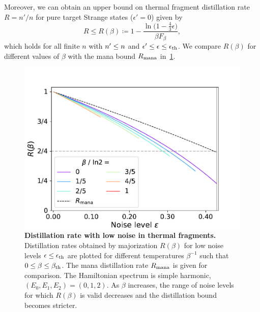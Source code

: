 \documentclass[pra,
aps,
twocolumn,
superscriptaddress,
groupedaddress,
nofootinbib,
reprint
]{revtex4-1}
\begin{document}
Moreover, we can obtain an upper bound on thermal fragment distillation rate $R=n'/n$ for pure target Strange states ($\epsilon' = 0$) given by
\begin{equation}
	R \leq R(\beta) \coloneqq 1 - \frac{\ln{\big( 1-\frac{4}{3}\epsilon \big)}}{\beta F_\beta},
\end{equation}
which holds for all finite $n$ with $\tt \leq n$ and $\epsilon' \leq \epsilon \leq \epsilon_{\rm{th}}$. 
We compare $R(\beta)$ for different values of $\beta$ with the mana bound $R_{\rm{mana}}$ in~\cref{fig:distill_bounds_temp}.
\begin{figure}[h]
    \centering
    \includegraphics[scale=0.5]{figs/distill_bounds_temp.pdf}
    \caption{\textbf{Distillation rate with low noise in thermal fragments.} Distillation rates obtained by majorization $R(\beta)$ for low noise levels $\epsilon \leq \epsilon_{\rm{th}}$ are plotted for different temperatures $\beta^{-1}$ such that $0 \leq \beta \leq \beta_{\rm{th}}$.
    The mana distillation rate $R_{\rm{mana}}$ is given for comparison.
    The Hamiltonian spectrum is simple harmonic, $(E_0, E_1, E_2) = (0,1,2)$.
    As $\beta$ increases, the range of noise levels for which $R(\beta)$ is valid decreases and the distillation bound becomes stricter.
    }
    \label{fig:distill_bounds_temp}
\end{figure}
\end{document}
